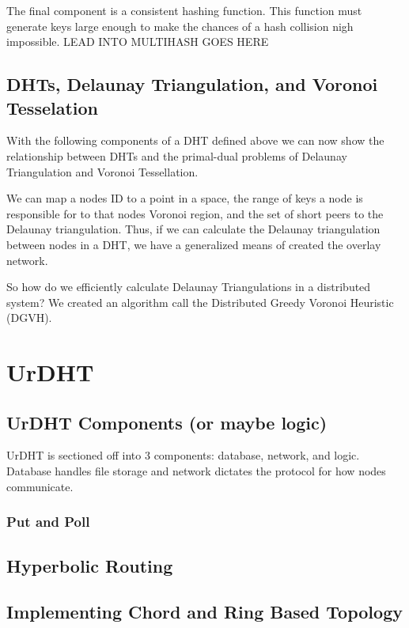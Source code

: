 \documentclass[11pt,conference]{IEEEtran}
\begin{document}
The final component is a consistent hashing function.
This function must generate keys large enough to make the chances of a hash collision nigh impossible.
LEAD INTO MULTIHASH GOES HERE

\subsection{DHTs, Delaunay Triangulation, and Voronoi Tesselation}
With the following components of a DHT defined above we can now show the relationship between DHTs and the primal-dual problems of Delaunay Triangulation and Voronoi Tessellation.


We can map a nodes ID to a point in a space, the range of keys a node is responsible for to that nodes Voronoi region, and the set of short peers to the Delaunay triangulation.
Thus, if we can calculate the Delaunay triangulation between nodes in a DHT, we have a generalized means of created the overlay network.

So how do we efficiently calculate Delaunay Triangulations in a distributed system?
We created an algorithm call the Distributed Greedy Voronoi Heuristic (DGVH).


\section{UrDHT}
\label{sec:urdht}
	\subsection{UrDHT Components (or maybe logic)}
	
	UrDHT is sectioned off into 3 components: database, network, and logic.
	Database handles file storage and network dictates the protocol for how nodes communicate.

	
	\subsubsection{Put and Poll}
	\subsection{Hyperbolic Routing}
	\label{sec:hyper}
	
	\subsection{Implementing Chord and Ring Based Topology}
	
\end{document}
